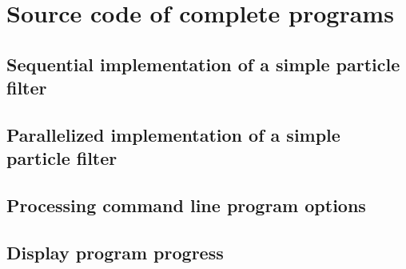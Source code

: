 \appendix

\section{Source code of complete programs}
\label{sec:Source code of complete programs}

\subsection{Sequential implementation of a simple particle filter}
\label{sub:Sequential implementation of a simple particle filter}

\subsection{Parallelized implementation of a simple particle filter}
\label{sub:Parallelized implementation of a simple particle filter}

\subsection{Processing command line program options}
\label{sub:Processing command line program options}

\subsection{Display program progress}
\label{sub:Display program progress}
